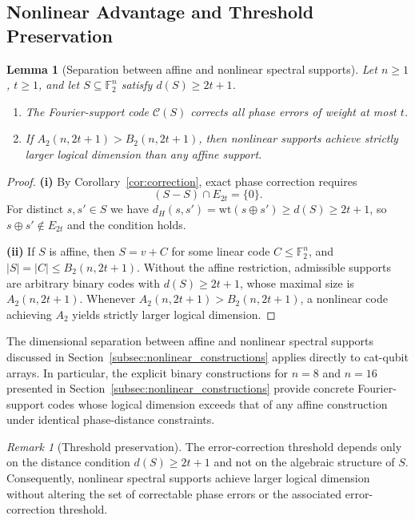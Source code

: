 \documentclass[a4paper,twocolumn,11pt,allowtoday]{quantumarticle}
\theoremstyle{plain}
\newtheorem{lemma}[theorem]{Lemma}
\theoremstyle{definition}
\theoremstyle{remark}
\newtheorem{remark}[theorem]{Remark}
\begin{document}
\subsection{Nonlinear Advantage and Threshold Preservation}
\label{subsec:catqubit_nonlinear}



\begin{lemma}[Separation between affine and nonlinear spectral supports]
\label{lem:catq_separation}
Let $n\ge1$, $t\ge1$, and let $S\subseteq\mathbb{F}_2^n$ satisfy
$d(S)\ge 2t+1$.
\begin{enumerate}
\item[\textup{(i)}] The Fourier-support code $\mathcal{C}(S)$
corrects all phase errors of weight at most $t$.

\item[\textup{(ii)}] If $A_2(n,2t+1)>B_2(n,2t+1)$, then nonlinear
supports achieve strictly larger logical dimension than any
affine support.
\end{enumerate}
\end{lemma}

\begin{proof}
\textbf{(i)}
By Corollary~\ref{cor:correction}, exact phase correction requires
\[
(S-S)\cap E_{2t}=\{0\}.
\]
For distinct $s,s'\in S$ we have
$d_H(s,s')=\mathrm{wt}(s\oplus s')\ge d(S)\ge 2t+1$,
so $s\oplus s'\notin E_{2t}$ and the condition holds.

\textbf{(ii)}
If $S$ is affine, then $S=v+C$ for some linear code
$C\le\mathbb{F}_2^n$, and $|S|=|C|\le B_2(n,2t+1)$.
Without the affine restriction, admissible supports are arbitrary
binary codes with $d(S)\ge 2t+1$, whose maximal size is
$A_2(n,2t+1)$. Whenever $A_2(n,2t+1)>B_2(n,2t+1)$,
a nonlinear code achieving $A_2$ yields strictly larger logical
dimension.
\end{proof}


The dimensional separation between affine and nonlinear spectral supports discussed in Section~\ref{subsec:nonlinear_constructions}
applies directly to cat-qubit arrays. In particular, the explicit binary constructions for
$n=8$ and $n=16$ presented in Section~\ref{subsec:nonlinear_constructions}
provide concrete Fourier-support codes whose logical dimension exceeds that of any affine construction under identical phase-distance constraints.

\begin{remark}[Threshold preservation]
\label{rem:catq_threshold}
The error-correction threshold depends only on the
distance condition $d(S)\ge2t+1$ and not on the algebraic
structure of $S$. Consequently, nonlinear spectral supports
achieve larger logical dimension without altering the
set of correctable phase errors or the associated
error-correction threshold.
\end{remark}
\end{document}
